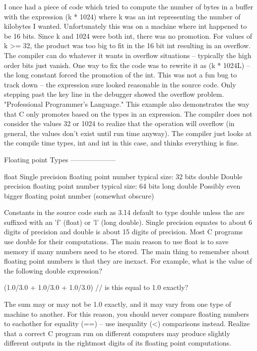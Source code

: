 I once had a piece of code which tried to compute the number of bytes in a buffer with the expression (k * 1024) where k was an int representing the number of kilobytes I wanted. Unfortunately this was on a machine where int happened to be 16 bits. Since k and 1024 were both int, there was no promotion. For values of k >= 32, the product was too big to fit in the 16 bit int resulting in an overflow. The compiler can do whatever it wants in overflow situations -- typically the high order bits just vanish. One way to fix the code was to rewrite it as (k * 1024L) -- the long constant forced the promotion of the int. This was not a fun bug to track down -- the expression sure looked reasonable in the source code. Only stepping past the key line in the debugger showed the overflow problem. "Professional Programmer's Language." This example also demonstrates the way that C only promotes based on the types in an expression. The compiler does not consider the values 32 or 1024 to realize that the operation will overflow (in general, the values don't exist until run time anyway). The compiler just looks at the compile time types, int and int in this case, and thinks everything is fine.

Floating point Types
--------------------

float 
    Single precision floating point number typical size: 32 bits 
double 
    Double precision floating point number typical size: 64 bits
long double 
    Possibly even bigger floating point number (somewhat obscure)

Constants in the source code such as 3.14 default to type double unless the are suffixed with an 'f' (float) or 'l' (long double). Single precision equates to about 6 digits of precision and double is about 15 digits of precision. Most C programs use double for their computations. The main reason to use float is to save memory if many numbers need to be stored. The main thing to remember about floating point numbers is that they are inexact. For example, what is the value of the following double expression?


   (1.0/3.0 + 1.0/3.0 + 1.0/3.0)    // is this equal to 1.0 exactly?

   The sum may or may not be 1.0 exactly, and it may vary from one type of machine to another. For this reason, you should never compare floating numbers to eachother for equality (==) -- use inequality (<) comparisons instead. Realize that a correct C program run on different computers may produce slightly different outputs in the rightmost digits of its floating point computations.

